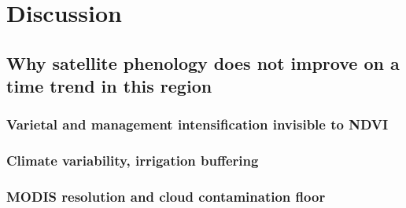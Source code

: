 \section{Discussion}
\label{sec:discussion}

\subsection{Why satellite phenology does not improve on a time trend in this region}
\label{sec:trend}
\subsubsection{Varietal and management intensification invisible to NDVI}
\subsubsection{Climate variability, irrigation buffering}
\subsubsection{MODIS resolution and cloud contamination floor}


